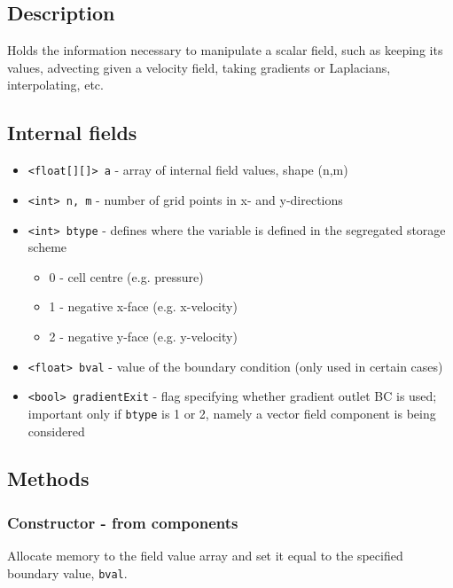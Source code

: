 \documentclass[notitlepage]{article}
\begin{document}
\subsection{Description}

Holds the information necessary to manipulate a scalar field,
such as keeping its values, advecting given a velocity field,
taking gradients or Laplacians, interpolating, etc.

\subsection{Internal fields}

\begin{itemize}
\item \texttt{<float[][]> a} - array of internal field values, shape (n,m)
\item \texttt{<int> n, m} - number of grid points in x- and y-directions
\item \texttt{<int> btype} - defines where the variable is defined in the segregated storage scheme
	\begin{itemize}
		\item 0 - cell centre (e.g. pressure)
		\item 1 - negative x-face (e.g. x-velocity)
		\item 2 - negative y-face (e.g. y-velocity)
	\end{itemize}
\item \texttt{<float> bval} - value of the boundary condition (only used in certain cases)
\item \texttt{<bool> gradientExit} - flag specifying whether gradient outlet BC is used;
	important only if \texttt{btype} is 1 or 2, namely a vector field component is being considered
\end{itemize}

\subsection{Methods}

\subsubsection{Constructor - from components}

Allocate memory to the field value array and set it equal
to the specified boundary value, \texttt{bval}.
\end{document}
